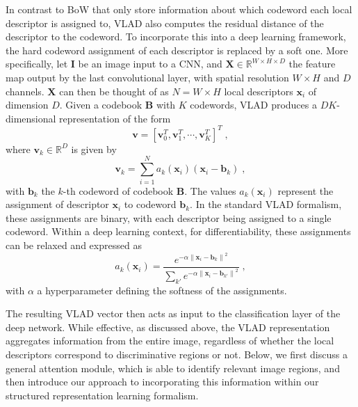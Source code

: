 \documentclass{bmvc2k}
\newcommand{\bB}{\mathbf{B}}
\newcommand{\bb}{\mathbf{b}}
\newcommand{\bX}{\mathbf{X}}
\newcommand{\bx}{\mathbf{x}}
\newcommand{\bv}{\mathbf{v}}
\newcommand{\bI}{\mathbf{I}}
\begin{document}
In contrast to BoW that only store information about which codeword each local descriptor is assigned to, VLAD also computes the residual distance of the descriptor to the codeword. 
To incorporate this into a deep learning framework, the hard codeword assignment of each descriptor is replaced by a soft one.
More specifically, let $\bI$ be an image input to a CNN, and $\bX \in \mathbb{R}^{W \times H \times D}$ the feature map output by the last convolutional layer, with spatial resolution $W \times H$ and $D$ channels. $\bX$ can then be thought of as $N = W \times H$ local descriptors $\bx_{i}$ of dimension $D$. Given a codebook $\bB$ with $K$ codewords, VLAD produces a $DK$-dimensional representation of the form
\begin{equation}
    \bv = [ \bv_0^T, \bv_1^T, \cdots, \bv_K^T]^T\;,
    \label{eq:vlad_vector}
\end{equation}
where $\bv_k \in \mathbb{R}^D$ is given by
\begin{equation}
       \bv_k = \sum_{i=1}^N a_k(\bx_{i})  \left( \bx_{i} - \bb_k \right)\;,
       \label{eq:vlad_residual}
\end{equation}
with $\bb_k$ the $k$-th codeword of codebook $\bB$. The values $a_k(\bx_{i})$ represent the assignment of descriptor $\bx_{i}$ to codeword $\bb_k$. In the standard VLAD formalism, these assignments are binary, with each descriptor being assigned to a single codeword. Within a deep learning context, for differentiability, these assignments can be relaxed and expressed as
\begin{equation}
      a_k(\bx_{i})= \frac{ e^{-\alpha\left\| \bx_{i}-\bb_k  \right\|^2}}{\sum_{k'}{e^{-\alpha\left\| \bx_{i}-\bb_{k'} \right \|^2}}}\;,
	\label{eq:vlad_soft_assgn}
\end{equation}	
with $\alpha$ a hyperparameter defining the softness of the assignments. 


The resulting VLAD vector then acts as input to the classification layer of the deep network. While effective, as discussed above, the VLAD representation aggregates information from the entire image, regardless of whether the local descriptors correspond to discriminative regions or not. Below, we first discuss a general attention module, which is able to identify relevant image regions, and then introduce our approach to incorporating this information within our structured representation learning formalism.
\end{document}
